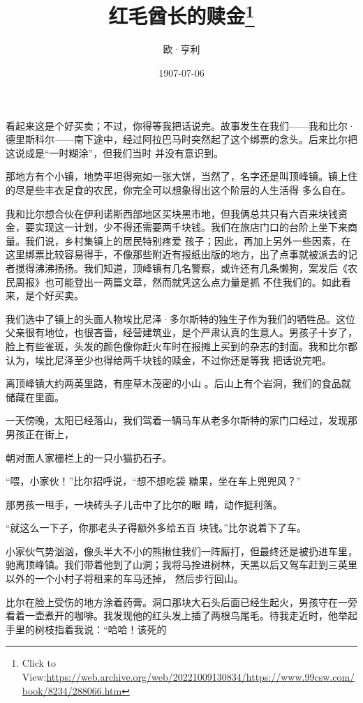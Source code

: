 \documentclass{article}
\title{红毛酋长的赎金\footnote{Click to View:\url{https://web.archive.org/web/20221009130834/https://www.99csw.com/book/8234/288066.htm}}}
\author{欧·亨利}
\date{1907-07-06}
\begin{document}

\maketitle


\Large

﻿看起来这是个好买卖；不过，你得等我把话说完。故事发生在我们——我和比尔·德里斯科尔——南下途中，经过阿拉巴马时突然起了这个绑票的念头。后来比尔把这说成是“一时糊涂”，但我们当时
并没有意识到。 

那地方有个小镇，地势平坦得宛如一张大饼，当然了，名字还是叫顶峰镇。镇上住的尽是些丰衣足食的农民，你完全可以想象得出这个阶层的人生活得
多么自在。 

我和比尔想合伙在伊利诺斯西部地区买块黑市地，但我俩总共只有六百来块钱资金，要实现这一计划，少不得还需要两千块钱。我们在旅店门口的台阶上坐下来商量。我们说，乡村集镇上的居民特别疼爱
\newpage
孩子；因此，再加上另外一些因素，在这里绑票比较容易得手，不像那些附近有报纸出版的地方，出了点事就被派去的记者搅得沸沸扬扬。我们知道，顶峰镇有几名警察，或许还有几条懒狗，案发后《农民周报》也可能登出一两篇文章，然而就凭这么点力量是抓
不住我们的。如此看来，是个好买卖。 

我们选中了镇上的头面人物埃比尼泽·多尔斯特的独生子作为我们的牺牲品。这位父亲很有地位，也很吝啬，经营建筑业，是个严肃认真的生意人。男孩子十岁了，脸上有些雀斑，头发的颜色像你赶火车时在报摊上买到的杂志的封面。我和比尔都认为，埃比尼泽至少也得给两千块钱的赎金，不过你还是等我
把话说完吧。 

离顶峰镇大约两英里路，有座草木茂密的小山
。后山上有个岩洞，我们的食品就储藏在里面。 

一天傍晚，太阳已经落山，我们驾着一辆马车从老多尔斯特的家门口经过，发现那男孩正在街上，

\newpage
朝对面人家栅栏上的一只小猫扔石子。 

“喂，小家伙！”比尔招呼说，“想不想吃袋
糖果，坐在车上兜兜风？” 

那男孩一甩手，一块砖头子儿击中了比尔的眼
睛，动作挺利落。 

“就这么一下子，你那老头子得额外多给五百
块钱。”比尔说着下了车。 

小家伙气势汹汹，像头半大不小的熊揪住我们一阵厮打，但最终还是被扔进车里，驰离顶峰镇。我们带着他到了山洞；我将马拴进树林，天黑以后又驾车赶到三英里以外的一个小村子将租来的车马还掉，
然后步行回山。 

比尔在脸上受伤的地方涂着药膏。洞口那块大石头后面已经生起火，男孩守在一旁看着一壶煮开的咖啡。我发现他的红头发上插了两根鸟尾毛。待我走近时，他举起手里的树枝指着我说：“哈哈！该死的
\end{document}
